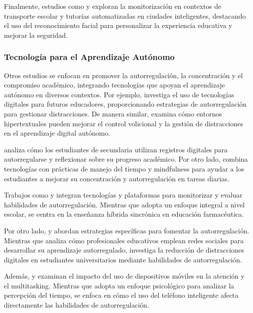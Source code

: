 \documentclass[a4paper,fleqn]{cas-sc}
\begin{document}
	Finalmente, estudios como \cite{Boumiza2017} y \cite{DaCosta2023} exploran la monitorización en contextos de transporte escolar y tutorías automatizadas en ciudades inteligentes, destacando el uso del reconocimiento facial para personalizar la experiencia educativa y mejorar la seguridad.
		
	\subsubsection{Tecnología para el Aprendizaje Autónomo}
	Otros estudios se enfocan en promover la autorregulación, la concentración y el compromiso académico, integrando tecnologías que apoyan el aprendizaje autónomo en diversos contextos. Por ejemplo, \cite{Bembich2016Future} investiga el uso de tecnologías digitales para futuros educadores, proporcionando estrategias de autorregulación para gestionar distracciones. De manera similar, \cite{Peters2003Self} examina cómo entornos hipertextuales pueden mejorar el control volicional y la gestión de distracciones en el aprendizaje digital autónomo.
	
	\cite{Roberts2020Task} analiza cómo los estudiantes de secundaria utilizan registros digitales para autorregularse y reflexionar sobre su progreso académico. Por otro lado, \cite{Adcroft2018Developing} combina tecnologías con prácticas de manejo del tiempo y mindfulness para ayudar a los estudiantes a mejorar su concentración y autorregulación en tareas diarias.
	
	Trabajos como \cite{Salter2014Exploring} y \cite{Palmer2022impact} integran tecnologías y plataformas para monitorizar y evaluar habilidades de autorregulación. Mientras que \cite{Salter2014Exploring} adopta un enfoque integral a nivel escolar, \cite{Palmer2022impact} se centra en la enseñanza híbrida sincrónica en educación farmacéutica.
	
	Por otro lado, \cite{Muljana2022Instructional} y \cite{wang2022empowering} abordan estrategias específicas para fomentar la autorregulación. Mientras que \cite{Muljana2022Instructional} analiza cómo profesionales educativos emplean redes sociales para desarrollar su aprendizaje autorregulado, \cite{wang2022empowering} investiga la reducción de distracciones digitales en estudiantes universitarios mediante habilidades de autorregulación.
	
	Además, \cite{Hartley2022Smartphone} y \cite{Labar2019Interplay} examinan el impacto del uso de dispositivos móviles en la atención y el multitasking. Mientras que \cite{Labar2019Interplay} adopta un enfoque psicológico para analizar la percepción del tiempo, \cite{Hartley2022Smartphone} se enfoca en cómo el uso del teléfono inteligente afecta directamente las habilidades de autorregulación.
	
\end{document}
